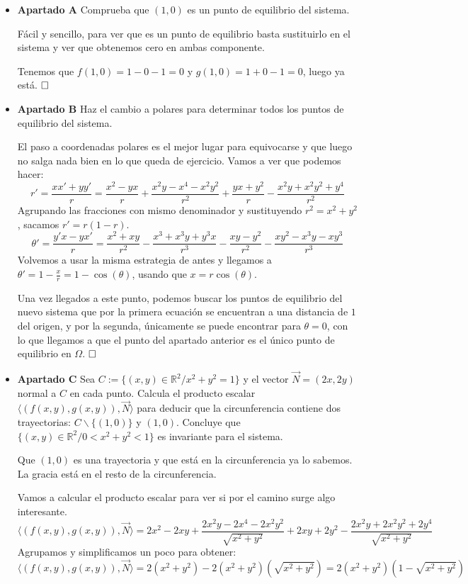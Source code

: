 \documentclass[spanish, a4paper, 12pt] {article}
\begin{document}
\begin{itemize}
\item{
\textbf{Apartado A} Comprueba que $(1, 0)$ es un punto de equilibrio del sistema.

Fácil y sencillo, para ver que es un punto de equilibrio basta sustituirlo en el sistema y ver que obtenemos cero en ambas componente.

Tenemos que $f(1,0) = 1 - 0 - 1 = 0$ y $g(1, 0) = 1 + 0 - 1 = 0$, luego ya está.
$\hfill \square$
}
\item{
\textbf{Apartado B} Haz el cambio a polares para determinar todos los puntos de equilibrio del sistema.

El paso a coordenadas polares es el mejor lugar para equivocarse y que luego no salga nada bien en lo que queda de ejercicio. Vamos a ver que podemos hacer:
$$
r' = \frac{xx' + yy'}{r} = \frac{x^2-yx}{r} + \frac{x^2y - x^4 - x^2y^2}{r^2} + \frac{yx + y^2}{r} - \frac{x^2y + x^2y^2 + y^4}{r^2}
$$
Agrupando las fracciones con mismo denominador y sustituyendo $r^2 = x^2 + y^2$, sacamos $\boxed{r' = r(1-r)}$.
$$
\theta' = \frac{y'x - yx'}{r} = \frac{x^2+xy}{r^2} - \frac{x^3 + x^3y + y^3x}{r^3} - \frac{xy - y^2}{r^2} - \frac{xy^2 - x^3y - xy^3}{r^3}
$$
Volvemos a usar la misma estrategia de antes y llegamos a $\boxed{\theta' = 1 - \frac{x}{r} = 1 - \cos(\theta)}$, usando que $x = r\cos(\theta)$.

Una vez llegados a este punto, podemos buscar los puntos de equilibrio del nuevo sistema que por la primera ecuación se encuentran a una distancia de $1$ del origen, y por la segunda, únicamente se puede encontrar para $\theta = 0$, con lo que llegamos a que el punto del apartado anterior es el único punto de equilibrio en $\Omega$.
$\hfill \square$
}
\item{
\textbf{Apartado C} Sea $C:=\{(x, y) \in \mathbb{R}^2 / x^2 + y^2 = 1\}$ y el vector $\vec{N} = (2x, 2y)$ normal a $C$ en cada punto. Calcula el producto escalar $\langle(f(x, y), g(x, y)), \vec{N}\rangle$ para deducir que la circunferencia contiene dos trayectorias: $C \backslash \{(1,0)\}$ y $(1,0)$. Concluye que $\{(x, y) \in \mathbb{R}^2 / 0 < x^2 + y^2 < 1\}$ es invariante para el sistema.

Que $(1,0)$ es una trayectoria y que está en la circunferencia ya lo sabemos. La gracia está en el resto de la circunferencia.

Vamos a calcular el producto escalar para ver si por el camino surge algo interesante.
$$
\langle(f(x, y), g(x, y)), \vec{N}\rangle = 2x^2 - 2xy + \frac{2x^2y - 2x^4 - 2x^2y^2}{\sqrt{x^2 + y^2}}
+
2xy + 2y^2 - \frac{2x^2y + 2x^2y^2 + 2y^4}{\sqrt{x^2 + y^2}}
$$
Agrupamos y simplificamos un poco para obtener:
$$
\langle(f(x, y), g(x, y)), \vec{N}\rangle = 2(x^2 + y^2) - 2(x^2 + y^2)(\sqrt{x^2 + y^2}) = 2(x^2 + y^2)(1-\sqrt{x^2 + y^2})
$$

}
\end{itemize}
\end{document}

